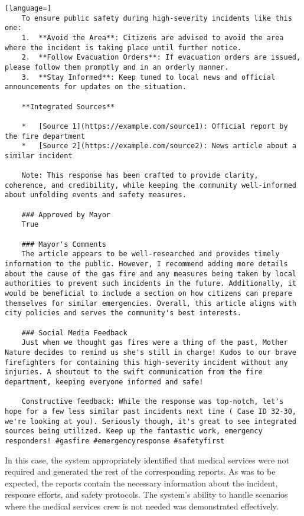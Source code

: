 \begin{lstlisting}[language=]
    To ensure public safety during high-severity incidents like this one:
    1.  **Avoid the Area**: Citizens are advised to avoid the area where the incident is taking place until further notice.
    2.  **Follow Evacuation Orders**: If evacuation orders are issued, please follow them promptly and in an orderly manner.
    3.  **Stay Informed**: Keep tuned to local news and official announcements for updates on the situation.

    **Integrated Sources**

    *   [Source 1](https://example.com/source1): Official report by the fire department
    *   [Source 2](https://example.com/source2): News article about a similar incident

    Note: This response has been crafted to provide clarity, coherence, and credibility, while keeping the community well-informed about unfolding events and safety measures.

    ### Approved by Mayor
    True

    ### Mayor's Comments
    The article appears to be well-researched and provides timely information to the public. However, I recommend adding more details about the cause of the gas fire and any measures being taken by local authorities to prevent such incidents in the future. Additionally, it would be beneficial to include a section on how citizens can prepare themselves for similar emergencies. Overall, this article aligns with city policies and serves the community's best interests.

    ### Social Media Feedback
    Just when we thought gas fires were a thing of the past, Mother Nature decides to remind us she's still in charge! Kudos to our brave firefighters for containing this high-severity incident without any injuries. A shoutout to the swift communication from the fire department, keeping everyone informed and safe!

    Constructive feedback: While the response was top-notch, let's hope for a few less similar past incidents next time ( Case ID 32-30, we're looking at you). Seriously though, it's great to see integrated sources being utilized. Keep up the fantastic work, emergency responders! #gasfire #emergencyresponse #safetyfirst
\end{lstlisting}

In this case, the system appropriately identified that medical services were not required and generated the rest of the corresponding reports. As was to be expected, the reports contain the necessary information about the incident, response efforts, and safety protocols. The system's ability to handle scenarios where the medical services crew is not needed was demonstrated effectively.

